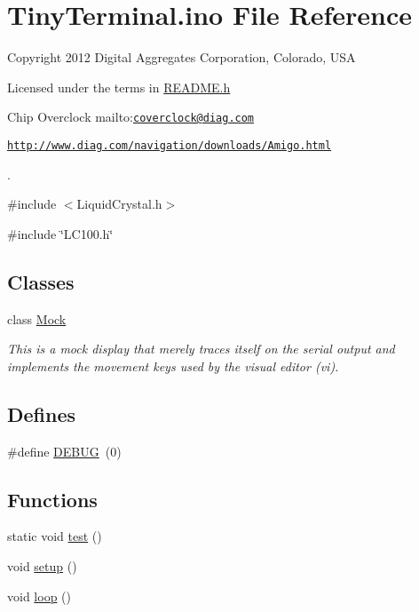 \hypertarget{TinyTerminal_8ino}{
\section{TinyTerminal.ino File Reference}
\label{TinyTerminal_8ino}
}


Copyright 2012 Digital Aggregates Corporation, Colorado, USA\par
 Licensed under the terms in \hyperlink{README_8h}{README.h}\par
 Chip Overclock mailto:\href{mailto:coverclock@diag.com}{\tt coverclock@diag.com}\par
 \href{http://www.diag.com/navigation/downloads/Amigo.html}{\tt http://www.diag.com/navigation/downloads/Amigo.html}\par
.  


{\ttfamily \#include $<$LiquidCrystal.h$>$}\par
{\ttfamily \#include \char`\"{}LC100.h\char`\"{}}\par
\subsection*{Classes}
\begin{DoxyCompactItemize}
\item 
class \hyperlink{classMock}{Mock}
\begin{DoxyCompactList}\small\item\em This is a mock display that merely traces itself on the serial output and implements the movement keys used by the visual editor (vi). \item\end{DoxyCompactList}\end{DoxyCompactItemize}
\subsection*{Defines}
\begin{DoxyCompactItemize}
\item 
\#define \hyperlink{TinyTerminal_8ino_ad72dbcf6d0153db1b8d8a58001feed83}{DEBUG}~(0)
\end{DoxyCompactItemize}
\subsection*{Functions}
\begin{DoxyCompactItemize}
\item 
\hypertarget{TinyTerminal_8ino_aa8dca7b867074164d5f45b0f3851269d}{
static void \hyperlink{TinyTerminal_8ino_aa8dca7b867074164d5f45b0f3851269d}{test} ()}
\label{TinyTerminal_8ino_aa8dca7b867074164d5f45b0f3851269d}

\item 
void \hyperlink{TinyTerminal_8ino_a4fc01d736fe50cf5b977f755b675f11d}{setup} ()
\item 
void \hyperlink{TinyTerminal_8ino_afe461d27b9c48d5921c00d521181f12f}{loop} ()
\end{DoxyCompactItemize}
